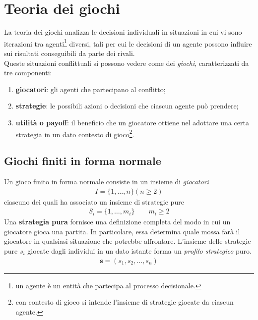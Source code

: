 
\chapter{Teoria dei giochi} %
\label{cha:teoria_dei_giochi}
La teoria dei giochi analizza le decisioni individuali in situazioni in cui vi sono iterazioni tra agenti\footnote{un agente è un entità che partecipa al processo decisionale.} diversi, tali per cui le decisioni di un agente possono influire sui risultati conseguibili da parte dei rivali.\\

Queste situazioni conflittuali si possono vedere come dei \emph{giochi}, caratterizzati da tre componenti:
\begin{enumerate}
	\item \textbf{giocatori}: gli agenti che partecipano al conflitto;
	\item \textbf{strategie}: le possibili azioni o decisioni che ciascun agente può prendere;
	\item \textbf{utilità o payoff}: il beneficio che un giocatore ottiene nel adottare una certa strategia in un dato contesto di gioco\footnote{con contesto di gioco si intende l’insieme di strategie giocate da ciascun agente.}.
\end{enumerate}

\section{Giochi finiti in forma normale} %
\label{sec:giochi_finiti_in_forma_normale}

Un gioco finito in forma normale consiste in un insieme di \emph{giocatori}
\begin{align}
	I= \{ 1,\dots, n\} (n \geq 2)
\end{align} ciascuno dei quali ha associato un insieme di strategie pure 
\begin{align}
	S_i = \{ 1, \dots, m_i \} \qquad m_i \geq 2
\end{align}
Una \textbf{strategia pura} fornisce una definizione completa del modo in cui un giocatore gioca una partita. In particolare, essa determina quale mossa farà il giocatore in qualsiasi situazione che potrebbe affrontare.
L’insieme delle strategie pure $s_i$ giocate dagli individui in un dato istante forma un \emph{profilo strategico} puro.
\begin{align}
	\mathbf{s} = (s_1, s_2, \dots, s_n)
\end{align}

